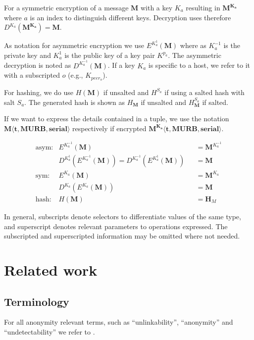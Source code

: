 \documentclass[acmsmall, screen, review]{acmart}
\begin{document}
	For a symmetric encryption of a message $\mathbf{M}$ with a key $K_a$ resulting in $\mathbf{M^{K_a}}$ where $a$ is an index to distinguish different keys. Decryption uses therefore $D^{K_a}(\mathbf{M^{K_a}})=\mathbf{M}$.
	
	As notation for asymmetric encryption we use $E^{K^{1}_a}(\mathbf{M})$ where as $K^{-1}_a$ is the private key and $K^{1}_a$ is the public key of a key pair $K^{p_a}$. The asymmetric decryption is noted as $D^{K^{-1}_a}(\mathbf{M})$. If a key $K_a$ is specific to a host, we refer to it with a subscripted $o$ (e.g., $K_{peer_o}$).
	
	For hashing, we do use $H(\mathbf{M})$ if unsalted and $H^{S_a}$ if using a salted hash with salt $S_a$. The generated hash is shown as $H_\mathbf{M}$ if unsalted and $H^{S_a}_\mathbf{M}$ if salted.
	
	If we want to express the details contained in a tuple, we use the notation $\mathbf{M\langle t,MURB,serial\rangle}$ respectively if encrypted $\mathbf{M^{K_{a}}\langle t,MURB,serial\rangle}$.
	
	\begin{align*}
	\text{asym:}         & E^{K^{-1}_a}\left(\mathbf{M}\right)                           && =\mathbf{M}^{K^{-1}_a}\\
	& D^{K^{1}_a}\left(E^{K^{-1}_a}\left(\mathbf{M}\right)\right) = D^{K^{-1}_a}\left(E^{K^{1}_a}\left(\mathbf{M}\right)\right)        && =\mathbf{M}\\
	\text{sym:}          & E^{K_a}\left(\mathbf{M}\right)                                && =\mathbf{M}^{K_a}\\
	& D^{K_a}\left(E^{K_a}\left(\mathbf{M}\right)\right)               && =\mathbf{M}\\
	\text{hash:}         & H\left(\mathbf{M}\right)                                      && =\mathbf{H}_M
	\end{align*}
	
	In general, subscripts denote selectors to differentiate values of the same type, and superscript denotes relevant parameters to operations expressed. The subscripted and superscripted information may be omitted where not needed.
	
	\section{Related work}
	\subsection{Terminology}
	For all anonymity relevant terms, such as ``unlinkability'', ``anonymity'' and ``undetectability'' we refer to \cite{anonTerminology}.
	
\end{document}
